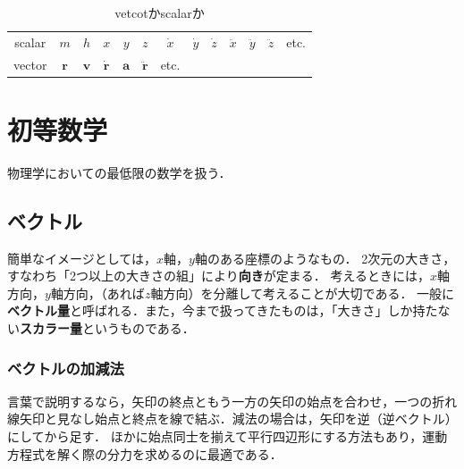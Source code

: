 \documentclass[a4paper,11pt]{ltjsarticle}
\begin{document}
\begin{table}[h]
  \centering
  \caption{vetcotかscalarか}
  \begin{tabular}{ccccccccccccc}
      \hline
      scalar & $m$ & $h$ & $x$ & $y$ & $z$ & $\dot{x}$ & $\dot{y}$ & $\dot{z}$ & $\ddot{x}$ & $\ddot{y}$ & $\ddot{z}$ & etc. \\
      vector & $\bm{r}$ & $\bm{v}$ & $\dot{\bm{r}}$ & $\bm{a}$ & $\ddot{\bm{r}}$ & etc.  & & & & & & \\
      \hline
  \end{tabular}
\end{table}

\clearpage

\pagestyle{fancy}
\rhead{}
\cfoot{\thepage}

\section{初等数学}

物理学においての最低限の数学を扱う．

\subsection{ベクトル}

簡単なイメージとしては，$x$軸，$y$軸のある座標のようなもの．
2次元の大きさ，すなわち「2つ以上の大きさの組」により\textbf{向き}が定まる．
考えるときには，$x$軸方向，$y$軸方向，（あれば$z$軸方向）を分離して考えることが大切である．
一般に\textbf{ベクトル量}と呼ばれる．また，今まで扱ってきたものは，「大きさ」しか持たない\textbf{スカラー量}というものである．

\subsubsection{ベクトルの加減法}

言葉で説明するなら，矢印の終点ともう一方の矢印の始点を合わせ，一つの折れ線矢印と見なし始点と終点を線で結ぶ．減法の場合は，矢印を逆（逆ベクトル）にしてから足す．
ほかに始点同士を揃えて平行四辺形にする方法もあり，運動方程式を解く際の分力を求めるのに最適である．

\end{document}
